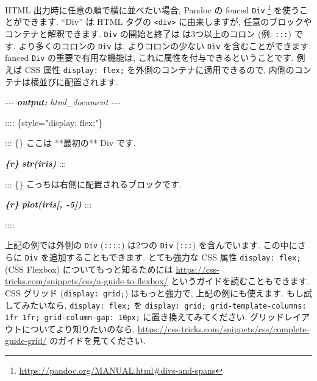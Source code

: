 \documentclass[
  11pt,
]{bxjsreport}
\newenvironment{Shaded}{\begin{snugshade}}{\end{snugshade}}
\newcommand{\AnnotationTok}[1]{\textcolor[rgb]{0.56,0.35,0.01}{\textbf{\textit{#1}}}}
\newcommand{\CommentTok}[1]{\textcolor[rgb]{0.56,0.35,0.01}{\textit{#1}}}
\newcommand{\InformationTok}[1]{\textcolor[rgb]{0.56,0.35,0.01}{\textbf{\textit{#1}}}}
\newcommand{\NormalTok}[1]{#1}
\renewcommand{\href}[2]{#2\footnote{\url{#1}}}
\begin{document}
HTML 出力時に任意の順で横に並べたい場合, Pandoc の \href{https://pandoc.org/MANUAL.html\#divs-and-spans}{fenced \texttt{Div}.} を使うことができます. ``Div'' は HTML タグの \texttt{\textless{}div\textgreater{}} に由来しますが, 任意のブロックやコンテナと解釈できます. \texttt{Div} の開始と終了は は3つ以上のコロン (例: \texttt{:::}) です. より多くのコロンの \texttt{Div} は, よりコロンの少ない \texttt{Div} を含むことができます. fanced \texttt{Div} の重要で有用な機能は, これに属性を付与できるということです. 例えば CSS 属性 \texttt{display: flex;} を外側のコンテナに適用できるので, 内側のコンテナは横並びに配置されます.

\begin{Shaded}
\begin{Highlighting}[]
\CommentTok{{-}{-}{-}}
\AnnotationTok{output:}\CommentTok{ html\_document}
\CommentTok{{-}{-}{-}}

\NormalTok{:::: \{style="display: flex;"\}}

\NormalTok{::: \{\}}
\NormalTok{ここは **最初の** Div です.}

\InformationTok{\textasciigrave{}\textasciigrave{}\textasciigrave{}\{r\}}
\InformationTok{str(iris)}
\InformationTok{\textasciigrave{}\textasciigrave{}\textasciigrave{}}
\NormalTok{:::}

\NormalTok{::: \{\}}
\NormalTok{こっちは右側に配置されるブロックです.}

\InformationTok{\textasciigrave{}\textasciigrave{}\textasciigrave{}\{r\}}
\InformationTok{plot(iris[, {-}5])}
\InformationTok{\textasciigrave{}\textasciigrave{}\textasciigrave{}}
\NormalTok{:::}

\NormalTok{::::}
\end{Highlighting}
\end{Shaded}

上記の例では外側の \texttt{Div} (\texttt{::::}) は2つの \texttt{Div} (\texttt{:::}) を含んでいます. この中にさらに \texttt{Div} を追加することもできます. とても強力な CSS 属性 \texttt{display: flex;} (CSS Flexbox) についてもっと知るためには \url{https://css-tricks.com/snippets/css/a-guide-to-flexbox/} というガイドを読むこともできます. CSS グリッド (\texttt{display: grid;}) はもっと強力で, 上記の例にも使えます. もし試してみたいなら, \texttt{display: flex;} を \texttt{display: grid; grid-template-columns: 1fr 1fr; grid-column-gap: 10px;} に置き換えてみてください. グリッドレイアウトについてより知りたいのなら, \url{https://css-tricks.com/snippets/css/complete-guide-grid/} のガイドを見てください.
\end{document}
